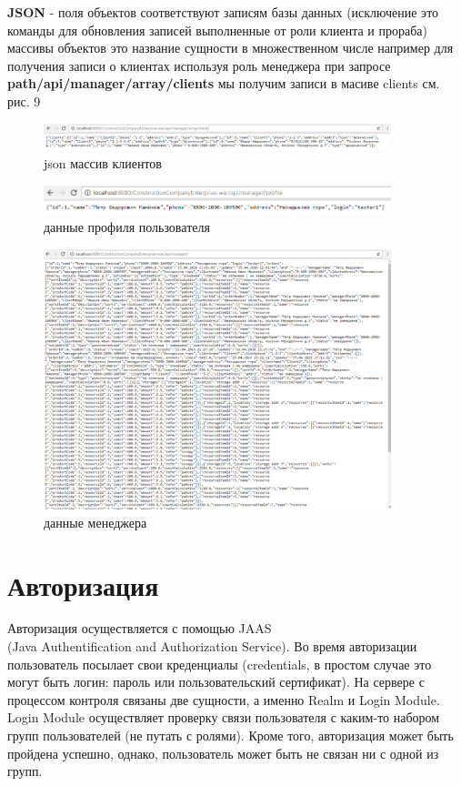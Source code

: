 \textbf{JSON} - поля объектов соответствуют записям базы данных (исключение это команды для обновления записей выполненные от роли клиента и прораба) массивы объектов это название сущности в множественном числе например для получения записи о клиентах используя роль менеджера при запросе\\
\textbf{\textbraceleft path\textbraceright /api/manager/array/clients} мы получим записи в масиве clients см. рис. 9
\begin{figure}[!ht]
	\centering
	\includegraphics[width=0.9\textwidth]{img/api_json_clients.png}
	\caption{json массив клиентов}
\end{figure}
\begin{figure}[!ht]
	\centering
	\includegraphics[width=0.9\textwidth]{img/api_profile.png}
	\caption{данные профиля пользователя}
\end{figure}
\begin{figure}[!ht]
	\centering
	\includegraphics[width=0.9\textwidth]{img/api_manager_json.png}
	\caption{данные менеджера}
\end{figure}
\newpage
\section{Авторизация}
Авторизация осуществляется с помощью JAAS \\
(Java Authentification and Authorization Service). Во время авторизации пользователь посылает свои креденциалы (credentials, в простом случае это могут быть логин: пароль или пользовательский сертификат). На сервере с процессом контроля связаны две сущности, а именно Realm и Login Module. Login Module осуществляет проверку связи пользователя с каким-то набором групп пользователей (не путать с ролями). Кроме того, авторизация может быть пройдена успешно, однако, пользователь может быть не связан ни с одной из групп.

